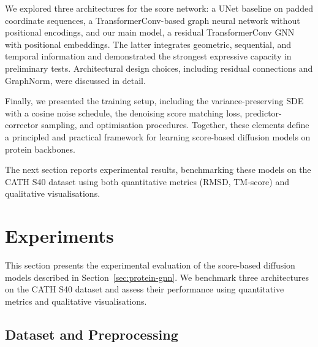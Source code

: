 \documentclass[a4paper,12pt]{article}
\begin{document}
We explored three architectures for the score network: a UNet baseline on padded coordinate sequences, a TransformerConv-based graph neural network without positional encodings, and our main model, a residual TransformerConv GNN with positional embeddings. The latter integrates geometric, sequential, and temporal information and demonstrated the strongest expressive capacity in preliminary tests. Architectural design choices, including residual connections and GraphNorm, were discussed in detail.

Finally, we presented the training setup, including the variance-preserving SDE with a cosine noise schedule, the denoising score matching loss, predictor-corrector sampling, and optimisation procedures. Together, these elements define a principled and practical framework for learning score-based diffusion models on protein backbones.

The next section reports experimental results, benchmarking these models on the CATH S40 dataset using both quantitative metrics (RMSD, TM-score) and qualitative visualisations.

\clearpage

\section{Experiments}\label{sec:Experiments}
This section presents the experimental evaluation of the score-based diffusion models described in Section~\ref{sec:protein-gnn}. We benchmark three architectures on the CATH S40 dataset and assess their performance using quantitative metrics and qualitative visualisations. 

\subsection{Dataset and Preprocessing}\label{subsec:dataset}
\end{document}
